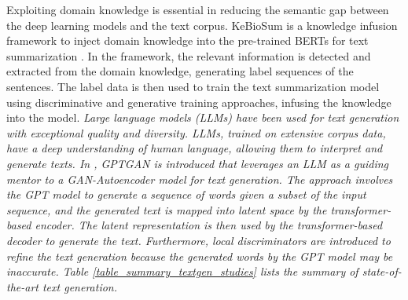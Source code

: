 \documentclass[preprint,12pt]{elsarticle}
\begin{document}
Exploiting domain knowledge is essential in reducing the semantic gap between the deep learning models and the text corpus. KeBioSum is a knowledge infusion framework to inject domain knowledge into the pre-trained BERTs for text summarization \citep{xie_pre-trained_2022}. In the framework, the relevant information is detected and extracted from the domain knowledge, generating label sequences of the sentences. The label data is then used to train the text summarization model using discriminative and generative training approaches, infusing the knowledge into the model. \emph{Large language models (LLMs) have been used for text generation with exceptional quality and diversity. LLMs, trained on extensive corpus data, have a deep understanding of human language, allowing them to interpret and generate texts. In \citep{hajipoor_gptgan_2025}, GPTGAN is introduced that leverages an LLM as a guiding mentor to a GAN-Autoencoder model for text generation. The approach involves the GPT model to generate a sequence of words given a subset of the input sequence, and the generated text is mapped into latent space by the transformer-based encoder. The latent representation is then used by the transformer-based decoder to generate the text. Furthermore, local discriminators are introduced to refine the text generation because the generated words by the GPT model may be inaccurate. Table \ref{table_summary_textgen_studies} lists the summary of state-of-the-art text generation.}
\end{document}
